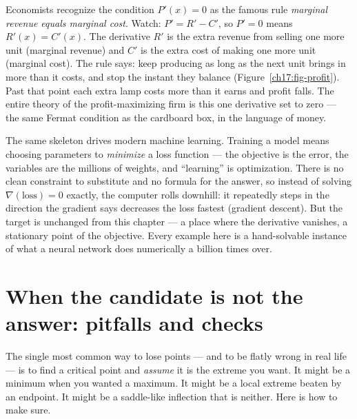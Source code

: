 \begin{applicationbox}
Economists recognize the condition $P'(x)=0$ as the famous rule \emph{marginal
revenue equals marginal cost}. Watch: $P'=R'-C'$, so $P'=0$ means $R'(x)=C'(x)$. The
derivative $R'$ is the extra revenue from selling one more unit (marginal revenue) and
$C'$ is the extra cost of making one more unit (marginal cost). The rule says: keep
producing as long as the next unit brings in more than it costs, and stop the instant
they balance (Figure~\ref{ch17:fig-profit}). Past that point each extra lamp costs more
than it earns and profit falls. The entire theory of the profit-maximizing firm is this one derivative set to
zero --- the same Fermat condition as the cardboard box, in the language of money.
\end{applicationbox}

\begin{applicationbox}
The same skeleton drives modern machine learning. Training a model means choosing
parameters to \emph{minimize} a loss function --- the objective is the error, the
variables are the millions of weights, and ``learning'' is optimization. There is no
clean constraint to substitute and no formula for the answer, so instead of solving
$\nabla(\text{loss})=0$ exactly, the computer rolls downhill: it repeatedly steps in
the direction the gradient says decreases the loss fastest (gradient descent). But the
target is unchanged from this chapter --- a place where the derivative vanishes, a
stationary point of the objective. Every example here is a hand-solvable instance of
what a neural network does numerically a billion times over.
\end{applicationbox}

\section{When the candidate is not the answer: pitfalls and checks}

The single most common way to lose points --- and to be flatly wrong in real life ---
is to find a critical point and \emph{assume} it is the extreme you want. It might be
a minimum when you wanted a maximum. It might be a local extreme beaten by an
endpoint. It might be a saddle-like inflection that is neither. Here is how to make
sure.

